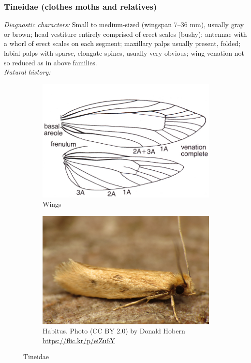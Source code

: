 \documentclass[letterpaper, 11pt]{article}
\begin{document}
\subsubsection{Tineidae (clothes moths and relatives)}
\noindent{}\textit{Diagnostic characters:} Small to medium-sized (wingspan 7--36 mm), usually gray or brown; head vestiture entirely comprised of erect scales (bushy); antennae with a whorl of erect scales on each segment; maxillary palps usually present, folded; labial palps with sparse, elongate spines, usually very obvious; wing venation not so reduced as in above families.\\

\noindent{}\textit{Natural history:} 

\begin{figure}[ht!]
    \centering
    \begin{subfigure}[ht!]{0.45\textwidth}
        \includegraphics[width=\textwidth]{image34}
        \caption{Wings}
        \label{fig:tineid1}
    \end{subfigure}
    \qquad %
    \begin{subfigure}[ht!]{0.45\textwidth}
        \includegraphics[width=\textwidth]{tineid1}
        \caption{Habitus. Photo (CC BY 2.0) by Donald Hobern \url{https://flic.kr/p/eiZu6Y}}
        \label{fig:tineid2}
    \end{subfigure}
    \caption{Tineidae}\label{fig:tineids}
\end{figure}
\end{document}

